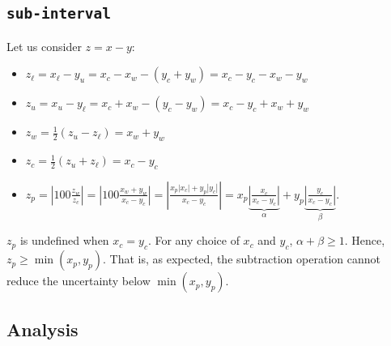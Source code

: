 \documentclass[12pt,a4paper]{article}
\newcommand\cc[1]{\texttt{#1}}
\newcommand{\abs}[1]{\left|#1\right|}
\begin{document}
\subsection{\cc{sub-interval}}

Let us consider $z = x - y$:
\begin{itemize}
\item $z_{\ell} = x_{\ell} - y_{u} = x_c - x_w - (y_c + y_w) = x_c - y_c - x_w - y_w$
\item $z_{u} = x_{u} - y_{\ell} = x_c + x_w - (y_c - y_w) = x_c - y_c + x_w + y_w$
\item $z_w = \frac{1}{2}(z_u - z_{\ell}) = x_w + y_w$
\item $z_c = \frac{1}{2}(z_u + z_{\ell}) = x_c - y_c$
\item $z_p = \abs{100\frac{z_w}{z_c}} = \abs{100\frac{x_w + y_w}{x_c - y_c}} =
  \abs{\frac{x_p\abs{x_c} + y_p\abs{y_c}}{x_c - y_c}} =
  x_p\underbrace{\abs{\frac{x_c}{x_c - y_c}}}_{\alpha} +
  y_p\underbrace{\abs{\frac{y_c}{x_c - y_c}}}_{\beta}$.
\end{itemize}
$z_p$ is undefined when $x_c = y_c$. For any choice of $x_c$ and $y_c$, $\alpha + \beta
\geq 1$. Hence, $z_p \geq \min(x_p, y_p)$. That is, as expected, the subtraction
operation cannot reduce the uncertainty below $\min(x_p, y_p)$.

\subsection{Analysis}
\end{document}
